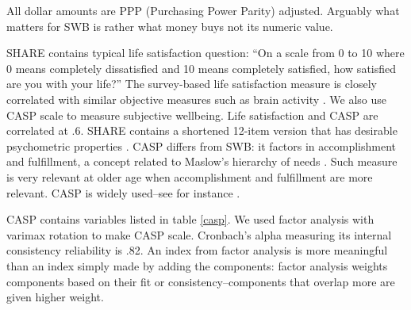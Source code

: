 \documentclass[10pt, letterpaper]{article}
\begin{document}
\begin{spacing}{1.4}

All dollar amounts are PPP (Purchasing Power Parity) adjusted. Arguably what matters for SWB is rather what money buys not its numeric value.

SHARE contains typical life satisfaction question: %
``On a scale from 0 to 10 where 0 means completely dissatisfied and 10 means
completely satisfied, how satisfied
are you with your life?'' The survey-based life
 satisfaction measure is closely correlated with similar objective
 measures such as brain activity \citep{layard05}.
 We also use CASP scale to measure subjective
wellbeing. Life satisfaction and CASP are correlated at .6.  SHARE contains a shortened 12-item version that has
desirable psychometric properties \citep{knesbeck2005quality}. CASP differs from
SWB: it factors in accomplishment and fulfillment, a concept related to Maslow's
hierarchy of needs \citep{maslow87}. Such measure is  very relevant at older age
when accomplishment and fulfillment are more relevant. %
  CASP is widely used--see for instance  \citet{perez2017psychometric,amit2010subjective,hyde03,hyde15,hyde2003measure,kim2015psychometric}. 

CASP contains  variables listed in table \ref{casp}. We used factor
analysis with varimax rotation to make CASP scale. Cronbach's alpha measuring its internal
consistency reliability is .82.  An index from factor analysis is more
meaningful than an index simply made by adding the components: factor analysis
weights components based on their fit or consistency--components that overlap
more are given higher weight.


\end{spacing}
\end{document}
